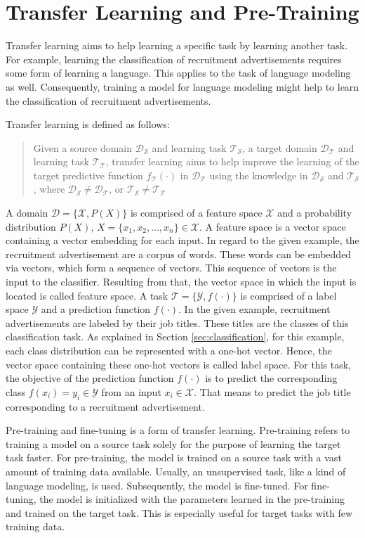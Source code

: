 	\section{Transfer Learning and Pre-Training}
	\label{sec:learning}
	Transfer learning aims to help learning a specific task by learning another task. For example, learning the classification of recruitment advertisements requires some form of learning a language. This applies to the task of language modeling as well. Consequently, training a model for language modeling might help to learn the classification of recruitment advertisements. 
	\par
	Transfer learning is defined as follows: \blockcquote{Pan.2010}{Given a source domain $\mathcal{D_S}$ and  learning  task $\mathcal{T_S}$,  a  target  domain $\mathcal{D_T}$ and  learning  task $\mathcal{T_T}$, transfer learning aims to help improve the learning of the target predictive function $f_{\mathcal{T}}(\cdot)$ in $\mathcal{D_T}$ using the knowledge in $\mathcal{D_S}$ and $\mathcal{T_S}$, where $\mathcal{D_S}\ne\mathcal{D_T}\text{, or } \mathcal{T_S} \ne \mathcal{T_T}$}. 
	A domain $\mathcal{D}=\{\mathcal{X},P(X)\}$ is comprised of a feature space $\mathcal{X}$ and a probability distribution $P(X) \text{, } X=\{x_1,x_2,\dots,x_n\} \in \mathcal{X}$. A feature space is a vector space containing a vector embedding for each input. In regard to the given example, the recruitment advertisement are a corpus of words. These words can be embedded via vectors, which form a sequence of vectors. This sequence of vectors is the input to the classifier. Resulting from that, the vector space in which the input is located is called feature space.
	A task  $\mathcal{T}=\{\mathcal{Y},f(\cdot)\}$ is comprised of a label space $\mathcal{Y}$ and a prediction function $f(\cdot)$. In the given example, recruitment advertisements are labeled by their job titles. These titles are the classes of this classification task. As explained in Section \ref{sec:classification}, for this example, each class distribution can be represented with a one-hot vector. Hence, the vector space containing these one-hot vectors is called label space. For this task, the objective of the prediction function $f(\cdot)$ is to predict the corresponding class $f(x_i)=y_i \in \mathcal{Y}$ from an input $x_i \in \mathcal{X}$. That means to predict the job title corresponding to a recruitment advertisement. \autocite{Pan.2010}
	\par
	Pre-training and fine-tuning is a form of transfer learning. Pre-training refers to training a model on a source task solely for the purpose of learning the target task faster. For pre-training, the model is trained on a source task with a vast amount of training data available. Usually, an unsupervised task, like a kind of language modeling, is used. Subsequently, the model is fine-tuned. For fine-tuning, the model is initialized with the parameters learned in the pre-training and trained on the target task. \autocites{Joshi.2019}{Devlin.2018}{Liu.2019}{Radford.2018}{Yang.2019}{Howard.2018}
	This is especially useful for target tasks with few training data.
